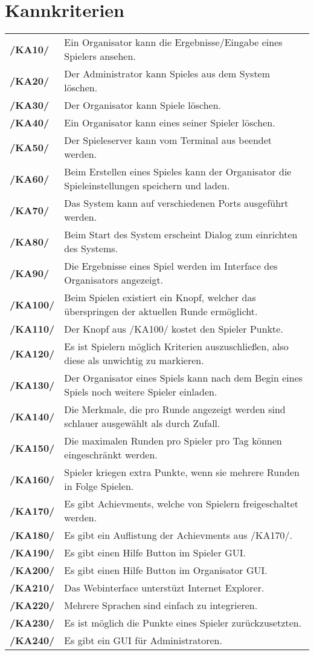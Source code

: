 \documentclass[a4paper]{scrreprt}
\begin{document}
\section{Kannkriterien}
\begin{tabularx}{\linewidth}{@{}>{\bfseries}l@{\hspace{.5em}}X@{}} %
/KA10/ & Ein \Gls{Organisator} kann die Ergebnisse/Eingabe eines Spielers ansehen. \\
/KA20/ & Der \Gls{Administrator} kann Spieles aus dem System löschen. \\
/KA30/ & Der \Gls{Organisator} kann Spiele löschen. \\
/KA40/ & Ein \Gls{Organisator} kann eines seiner \Gls{Spieler} löschen. \\
/KA50/ & Der \Gls{Spieleserver} kann vom Terminal aus beendet werden. \\
/KA60/ & Beim Erstellen eines Spieles kann der \Gls{Organisator} die \Gls{Spieleinstellungen} speichern und laden. \\
/KA70/ & Das System kann auf verschiedenen Ports ausgeführt werden. \\
/KA80/ & Beim Start des System erscheint Dialog zum einrichten des Systems. \\
/KA90/ & Die Ergebnisse eines \Gls{Spiel} werden im Interface des \Gls{Organisator}s angezeigt. \\
/KA100/ & Beim Spielen existiert ein Knopf, welcher das überspringen der aktuellen Runde ermöglicht. \\
/KA110/ & Der Knopf aus /KA100/ kostet den \Gls{Spieler} Punkte. \\
/KA120/ & Es ist \Gls{Spieler}n möglich Kriterien auszuschließen, also diese als unwichtig zu markieren. \\
/KA130/ & Der \Gls{Organisator} eines Spiels kann nach dem Begin eines Spiels noch weitere Spieler einladen. \\
/KA140/ & Die Merkmale, die pro Runde angezeigt werden sind schlauer ausgewählt als durch Zufall. \\
/KA150/ & Die maximalen Runden pro Spieler pro Tag können eingeschränkt werden. \\
/KA160/ & \Gls{Spieler} kriegen extra Punkte, wenn sie mehrere Runden in Folge Spielen. \\
/KA170/ & Es gibt \Gls{Achievment}s, welche von Spielern freigeschaltet werden. \\
/KA180/ & Es gibt ein Auflistung der \Gls{Achievment}s aus /KA170/. \\
/KA190/ & Es gibt einen Hilfe Button im \Gls{Spieler} GUI. \\
/KA200/ & Es gibt einen Hilfe Button im \Gls{Organisator} GUI. \\
/KA210/ & Das Webinterface unterstüzt Internet Explorer. \\
/KA220/ & Mehrere Sprachen sind einfach zu integrieren. \\ 
/KA230/ & Es ist möglich die Punkte eines \Gls{Spieler} zurückzusetzten. \\
/KA240/ & Es gibt ein GUI für \Gls{Administrator}en. \\
\end{tabularx} 
\end{document}
